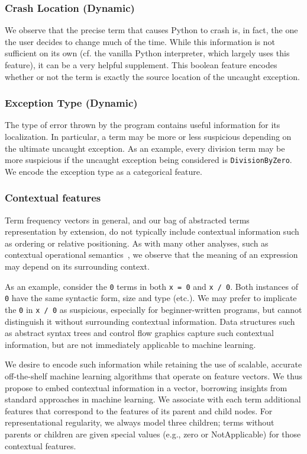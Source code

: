 \documentclass[conference]{IEEEtran}
\newcommand\lt[1]{{\lstinline|#1|}}
\begin{document}
\subsubsection{Crash Location (Dynamic)} We observe that the precise term that
causes Python to crash is, in fact, the one the user decides to change
much of the time. While this information is not sufficient on its own
(cf. the vanilla Python interpreter, which largely uses this feature),
it can be a very helpful supplement. This boolean feature encodes whether
or not the term is exactly the source location of the uncaught exception.

\subsubsection{Exception Type (Dynamic)} The type of error thrown by the program
contains useful information for its localization. In particular, a term may be
more or less suspicious depending on the ultimate uncaught exception. As an
example, every division term may be more suspicious if the uncaught exception
being considered is \lt{DivisionByZero}. We encode the exception type as
a categorical feature.

\subsubsection{Contextual features}

Term frequency vectors in general, and our bag of abstracted terms
representation by extension, do not typically include contextual
information such as ordering or relative positioning. As with many other
analyses, such as contextual operational semantics~\cite{FIXME}, we observe
that the meaning of an expression may depend on its surrounding context.

As an example, consider the \lt{0} terms in both \lt{x = 0} and \lt{x / 0}.
Both instances of \lt{0} have the same syntactic form, size and type
(etc.). We may prefer to implicate the \lt{0} in \lt{x / 0} as suspicious,
especially for beginner-written programs, but cannot distinguish it without
surrounding contextual information. Data structures such as abstract syntax
trees and control flow graphics capture such contextual information, but
are not immediately applicable to machine learning.

We desire to encode such information while retaining the use of scalable,
accurate off-the-shelf machine learning algorithms that operate on feature
vectors. We thus propose to embed contextual information in a vector,
borrowing insights from standard approaches in machine learning. We
associate with each term additional features that correspond to the features of
its parent and child nodes. For representational regularity, we always
model three children; terms without parents or children are given special
values (e.g., zero or NotApplicable) for those contextual features.
\end{document}
